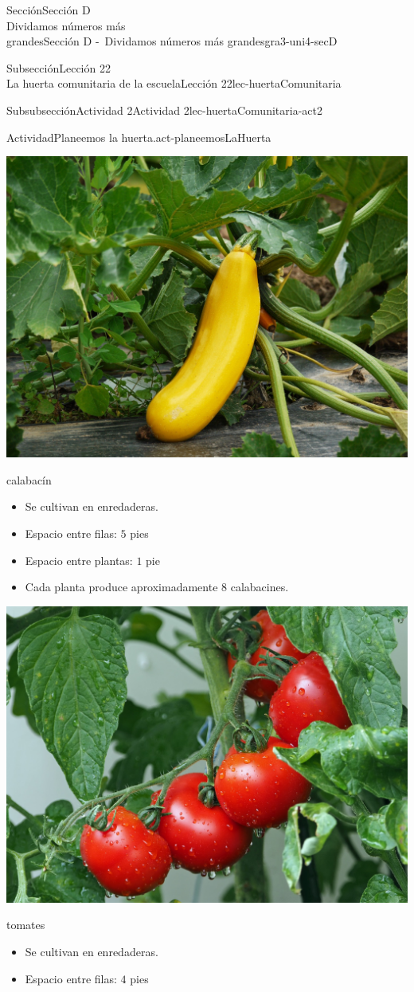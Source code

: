 \begin{sectionptx}{Sección}{{\Large Sección D\\}Dividamos números más\\grandes}{}{Sección D -~Dividamos números más grandes}{}{}{gra3-uni4-secD}
\begin{subsectionptx}{Subsección}{{\normalsize Lección 22\\[-0.05cm]}La huerta comunitaria de la escuela}{}{Lección 22}{}{}{lec-huertaComunitaria}
\begin{subsubsectionptx}{Subsubsección}{Actividad 2}{}{Actividad 2}{}{}{lec-huertaComunitaria-act2}
\begin{activity}{Actividad}{Planeemos la huerta.}{act-planeemosLaHuerta}
\begin{sidebyside}{2}{0.025}{0.025}{0.05}
\begin{sbspanel}{0.45}
\includegraphics[max width=0.8\linewidth, center]{external/jpg-source/3-4-D-22 Act2-calabacin.jpg}
%
\par
calabacín%
%
\begin{itemize}[label=\textbullet]
\item{}Se cultivan en enredaderas.%
\item{}Espacio entre filas: \(5\) pies%
\item{}Espacio entre plantas: \(1\) pie%
\item{}Cada planta produce aproximadamente \(8\) calabacines.%
\end{itemize}
\end{sbspanel}%
\begin{sbspanel}{0.45}%
\includegraphics[max width=0.8\linewidth, center]{external/jpg-source/3-4-D-22 Act2-tomate.jpg}
%
\par
tomates%
%
\begin{itemize}[label=\textbullet]
\item{}Se cultivan en enredaderas.%
\item{}Espacio entre filas: \(4\) pies%

\end{itemize}
\end{sbspanel}
\end{sidebyside}
\end{activity}
\end{subsubsectionptx}
\end{subsectionptx}
\end{sectionptx}
